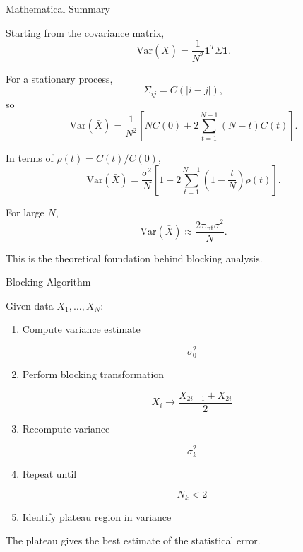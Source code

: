 \documentclass{beamer}
\begin{document}
\begin{frame}{Mathematical Summary}

Starting from the covariance matrix,
\[
\mathrm{Var}(\bar X)=\frac{1}{N^2}\bm{1}^T\Sigma\bm{1}.
\]

For a stationary process,
\[
\Sigma_{ij}=C(|i-j|),
\]
so
\[
\mathrm{Var}(\bar X)
=
\frac{1}{N^2}
\left[
N C(0)+2\sum_{t=1}^{N-1}(N-t)C(t)
\right].
\]

In terms of $\rho(t)=C(t)/C(0)$,
\[
\mathrm{Var}(\bar X)
=
\frac{\sigma^2}{N}
\left[
1+2\sum_{t=1}^{N-1}\left(1-\frac{t}{N}\right)\rho(t)
\right].
\]

For large $N$,
\[
\mathrm{Var}(\bar X)\approx \frac{2\tau_{\mathrm{int}}\sigma^2}{N}.
\]

This is the theoretical foundation behind blocking analysis.
\end{frame}


\begin{frame}{Blocking Algorithm}

  Given data $X_1,\dots,X_N$:

  \begin{enumerate}

  \item Compute variance estimate

    \[
    \sigma_0^2
    \]

  \item Perform blocking transformation

    \[
    X_i \rightarrow \frac{X_{2i-1}+X_{2i}}{2}
    \]

  \item Recompute variance

    \[
    \sigma_k^2
    \]

  \item Repeat until

    \[
    N_k < 2
    \]

  \item Identify plateau region in variance

  \end{enumerate}

  The plateau gives the best estimate of the statistical error.
\end{frame}

\end{document}
